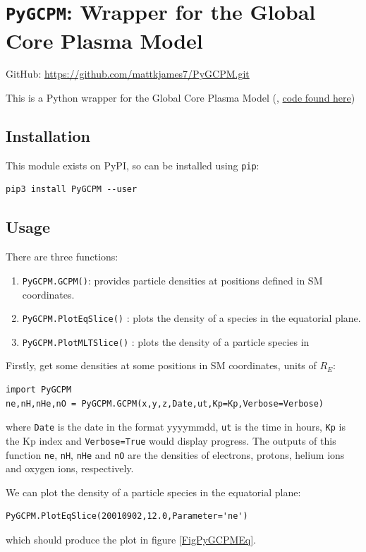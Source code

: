 	\section{\texttt{PyGCPM}: Wrapper for the Global Core Plasma Model}
	
		GitHub: \href{https://github.com/mattkjames7/PyGCPM.git}{https://github.com/mattkjames7/PyGCPM.git}

		This is a Python wrapper for the Global Core Plasma Model (\citet{Gallagher2000}, \href{https://plasmasphere.nasa.gov/models/}{code found here})

		\subsection{Installation}

			This module exists on PyPI, so can be installed using \texttt{pip}:
			\begin{verbatim}
pip3 install PyGCPM --user
			\end{verbatim}

		\subsection{Usage}

			There are three functions:
			\begin{enumerate}
				\item \texttt{PyGCPM.GCPM()}: provides particle densities at positions defined in SM coordinates.
				\item \texttt{PyGCPM.PlotEqSlice()} : plots the density of a species in the equatorial plane.
				\item \texttt{PyGCPM.PlotMLTSlice()} : plots the density of a particle species in 
			\end{enumerate}

			Firstly, get some densities at some positions in SM coordinates, units of $R_E$:
			\begin{verbatim}
import PyGCPM
ne,nH,nHe,nO = PyGCPM.GCPM(x,y,z,Date,ut,Kp=Kp,Verbose=Verbose)
			\end{verbatim}
			where \texttt{Date} is the date in the format yyyymmdd, \texttt{ut} is the time in hours, \texttt{Kp} is the Kp index and \texttt{Verbose=True} would display progress. The outputs of this function \texttt{ne}, \texttt{nH}, \texttt{nHe} and \texttt{nO} are the densities of electrons, protons, helium ions and oxygen ions, respectively.

			We can plot the density of a particle species in the equatorial plane:
			\begin{verbatim}
PyGCPM.PlotEqSlice(20010902,12.0,Parameter='ne')
			\end{verbatim}
			which should produce the plot in figure \ref{FigPyGCPMEq}.

